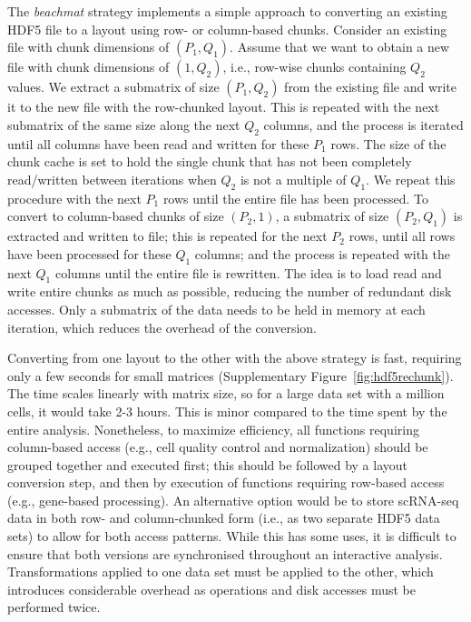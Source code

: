 \documentclass{article}
\newcommand{\beachmat}{\textit{beachmat}}
\begin{document}
The \beachmat{} strategy implements a simple approach to converting an existing HDF5 file to a layout using row- or column-based chunks.
Consider an existing file with chunk dimensions of $(P_1, Q_1)$. 
Assume that we want to obtain a new file with chunk dimensions of $(1, Q_2)$, i.e., row-wise chunks containing $Q_2$ values.
We extract a submatrix of size $(P_1, Q_2)$ from the existing file and write it to the new file with the row-chunked layout.
This is repeated with the next submatrix of the same size along the next $Q_2$ columns, and the process is iterated until all columns have been read and written for these $P_1$ rows.
The size of the chunk cache is set to hold the single chunk that has not been completely read/written between iterations when $Q_2$ is not a multiple of $Q_1$.
We repeat this procedure with the next $P_1$ rows until the entire file has been processed.
To convert to column-based chunks of size $(P_2, 1)$, a submatrix of size $(P_2, Q_1)$ is extracted and written to file; this is repeated for the next $P_2$ rows, until all rows have been processed for these $Q_1$ columns; and the process is repeated with the next $Q_1$ columns until the entire file is rewritten.
The idea is to load read and write entire chunks as much as possible, reducing the number of redundant disk accesses.
Only a submatrix of the data needs to be held in memory at each iteration, which reduces the overhead of the conversion.

Converting from one layout to the other with the above strategy is fast, requiring only a few seconds for small matrices (Supplementary Figure~\ref{fig:hdf5rechunk}).
The time scales linearly with matrix size, so for a large data set with a million cells, it would take 2-3 hours.
This is minor compared to the time spent by the entire analysis.
Nonetheless, to maximize efficiency, all functions requiring column-based access (e.g., cell quality control and normalization) should be grouped together and executed first; 
this should be followed by a layout conversion step, and then by execution of functions requiring row-based access (e.g., gene-based processing).
An alternative option would be to store scRNA-seq data in both row- and column-chunked form (i.e., as two separate HDF5 data sets) to allow for both access patterns.
While this has some uses, it is difficult to ensure that both versions are synchronised throughout an interactive analysis.
Transformations applied to one data set must be applied to the other, which introduces considerable overhead as operations and disk accesses must be performed twice.
\end{document}
